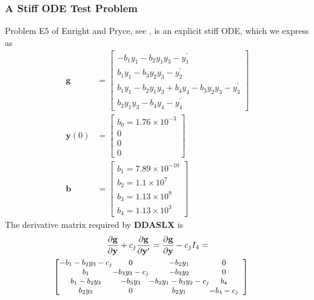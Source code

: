 \documentclass[twoside]{MATH77}
\begin{document}
\subsubsection{A Stiff ODE Test Problem\label{stiff_ode}}
Problem E5 of Enright and Pryce, see \cite{Enright:1987:TFP},
is an explicit stiff ODE, which we express as
\begin{align*}
  \mathbf{g}&=
  \begin{bmatrix}
    -b_{1}y_{1}-b_{2}y_{1}y_{3}-y_{1}^{\prime}\\
    b_{1}y_{1}-b_{3}y_{2}y_{3}-y_{2}^{\prime}\\
    b_{1}y_{1}-b_{2}y_{1}y_{3}+b_{4}y_{4}-b_{3}y_{2}y_{3}-y_{3}^{\prime}\\
    b_{2}y_{1}y_{3}-b_{4}y_{4}-y_{4}^{\prime}
  \end{bmatrix}\\
  \mathbf{y}(0)&=
  \begin{bmatrix}
    b_{0}=1.76\times10^{-3}\\
    0\\
    0\\
    0
  \end{bmatrix}\\
  \mathbf{b}&=
  \begin{bmatrix}
    b_{1}=7.89\times10^{-10}\\
    b_{2}=1.1\times10^{7}\\
    b_{3}=1.13\times10^{9}\\
    b_{4}=1.13\times10^{3}
  \end{bmatrix}
\end{align*}
The derivative matrix required by \textbf{DDASLX} is
\begin{multline*}
  \frac{\partial \mathbf{g}}{\partial \mathbf{y}}+c_{j}
  \frac{\partial \mathbf{g}}{\partial \mathbf{y}^{\prime}}
  =\frac{\partial \mathbf{g}}{\partial \mathbf{y}}-c_{j}I_{4}=\\
  {\small
    \hspace{-15pt}\left[
      \begin{array}{*{4}{@{}c}}
        -b_{1}-b_{2}y_{3}-c_{j} & 0 & -b_{2}y_{1} & 0\\
        b_{1} & -b_{3}y_{3}-c_{j} & -b_{3}y_{2} & 0\\
        b_{1}-b_{2}y_{3} & -b_{3}y_{3} & -b_{2}y_{1}-b_{3}y_{2}-c_{j} & b_{4}\\
        b_{2}y_{3} & 0 & b_{2}y_{1} & -b_{4}-c_{j}
      \end{array}
    \right]
  }
\end{multline*}
\end{document}
